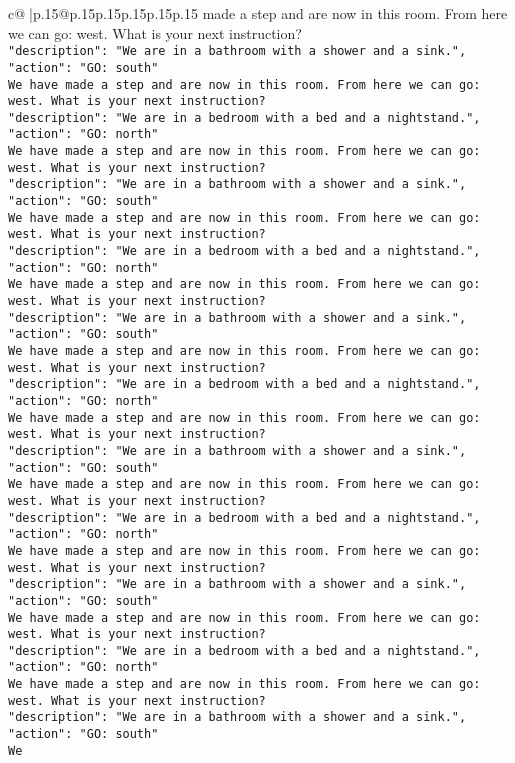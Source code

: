 \documentclass{article}
\begin{document}
{\begin{supertabular}{c@{$\;$}|p{.15\linewidth}@{}p{.15\linewidth}p{.15\linewidth}p{.15\linewidth}p{.15\linewidth}p{.15\linewidth}}
{{{made a step and are now in this room. From here we can go: west. What is your next instruction?\\ \tt {"description": "We are in a bathroom with a shower and a sink.", "action": "GO: south"}\\ \tt We have made a step and are now in this room. From here we can go: west. What is your next instruction?\\ \tt {"description": "We are in a bedroom with a bed and a nightstand.", "action": "GO: north"}\\ \tt We have made a step and are now in this room. From here we can go: west. What is your next instruction?\\ \tt {"description": "We are in a bathroom with a shower and a sink.", "action": "GO: south"}\\ \tt We have made a step and are now in this room. From here we can go: west. What is your next instruction?\\ \tt {"description": "We are in a bedroom with a bed and a nightstand.", "action": "GO: north"}\\ \tt We have made a step and are now in this room. From here we can go: west. What is your next instruction?\\ \tt {"description": "We are in a bathroom with a shower and a sink.", "action": "GO: south"}\\ \tt We have made a step and are now in this room. From here we can go: west. What is your next instruction?\\ \tt {"description": "We are in a bedroom with a bed and a nightstand.", "action": "GO: north"}\\ \tt We have made a step and are now in this room. From here we can go: west. What is your next instruction?\\ \tt {"description": "We are in a bathroom with a shower and a sink.", "action": "GO: south"}\\ \tt We have made a step and are now in this room. From here we can go: west. What is your next instruction?\\ \tt {"description": "We are in a bedroom with a bed and a nightstand.", "action": "GO: north"}\\ \tt We have made a step and are now in this room. From here we can go: west. What is your next instruction?\\ \tt {"description": "We are in a bathroom with a shower and a sink.", "action": "GO: south"}\\ \tt We have made a step and are now in this room. From here we can go: west. What is your next instruction?\\ \tt {"description": "We are in a bedroom with a bed and a nightstand.", "action": "GO: north"}\\ \tt We have made a step and are now in this room. From here we can go: west. What is your next instruction?\\ \tt {"description": "We are in a bathroom with a shower and a sink.", "action": "GO: south"}\\ \tt We }}}
\end{supertabular}}
\end{document}
